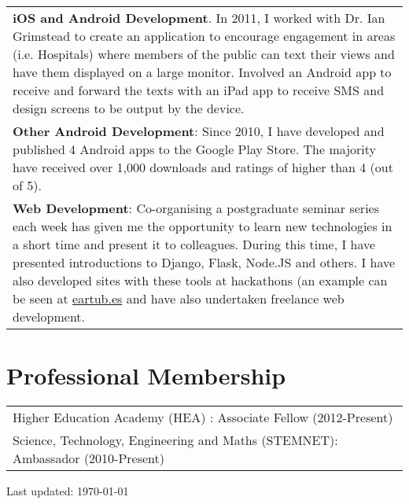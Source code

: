 \documentclass[11pt,fullpage]{article}
\begin{document}
\begin{tabular}{>{\everypar{\hangindent0.5in}}p{6in}}
	\textbf{iOS and Android Development}. In 2011, I worked with Dr. Ian Grimstead to create an application to encourage engagement in areas (i.e. Hospitals) where members of the public 		can text their views and have them displayed on a large monitor. Involved an Android app to receive and forward the texts with an iPad app to receive SMS and design screens to be 			output by the device. \\
	\textbf{Other Android Development}: Since 2010, I have developed and published 4 Android apps to the Google Play Store. The majority have received over 1,000 downloads and ratings of higher than 	4 (out of 5). \\
	\textbf{Web Development}: Co-organising a postgraduate seminar series each week has given me the opportunity to learn new technologies in a short time and present it to colleagues. During this 	time, I have presented introductions to Django, Flask, Node.JS and others. I have also developed sites with these tools at hackathons (an example can be seen at 						    \href{http://eartub.es}{eartub.es} and have also undertaken freelance web development.
\end{tabular}

\section*{Professional Membership}

\begin{tabular}{>{\everypar{\hangindent0.5in}}p{6in}}
	Higher Education Academy (HEA) : Associate Fellow (2012-Present) \\
	Science, Technology, Engineering and Maths (STEMNET): Ambassador (2010-Present)
\end{tabular}
\bigskip
\begin{center}
  \begin{footnotesize}
    Last updated: \today
  \end{footnotesize}
\end{center}

\end{document}
